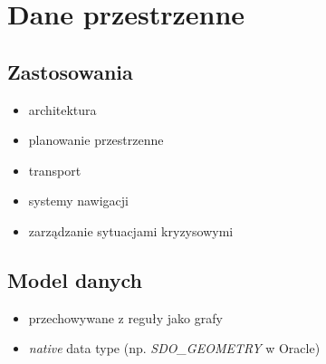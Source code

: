 \documentclass[12pt]{article}
\begin{document}
\begin{comment}
 * koszt
  - w najgorszym przypadku
  b_r * b_s + b_r
  - w najlepszym przypadku
  b_r + b_s

 * jesli zlaczenie jest rownozlaczeniem i dotyczy atrybutu ktory jest kluczem relacji wewnetrznej to przetwarzanie w petli wewnetrznej moze sie zatrzymac 
 * relacja wewnetrzna moze byc skanowana na przemian w przod i wstecz (zgodnosc z algorytmem LRU)

INDEXED NESTED-LOOP JOIN
 * zamiast skanowania relacji wewnetrznej mozna uzyc indeksu
  - zlaczenie jest rownorozlaczeniem
  - istnieje odpowiedni indeks dla relacji wewnetrznej
    - jezeli indeks nie istnieje to mozna rozwazyc utworzenie indeksu

 * jesli dostepne sa indeksy dla obu relacji to jako zewn. nalezy wybrac relacje o mniejszej liczbie krotek

Inne zagadnienia
- co z wynikami posrednimi
- zeby zrealizowac zadanie trzeba wykonac kilka operacji
- wyjscie operacji jest wejsciem dla kolejnej

Podsumowanie
- Optymalizacja kosztowa jest kosztowna
- Alternatywa
 - optymalizacja regulowa
 - rozwiazania mieszane
  - optymalizacja regulowa + kosztowa (odciecie bezsensownych rozwiazan)
  (optymalizacja regulowa nei sprawdzala sie sama bo nie brala pod uwage dystrybucji danych)
\end{comment}

\section{Dane przestrzenne}

\subsection{Zastosowania}
\begin{itemize}
\item architektura
\item planowanie przestrzenne
\item transport
\item systemy nawigacji
\item zarządzanie sytuacjami kryzysowymi
\end{itemize}


\subsection{Model danych}
\begin{itemize}
\item przechowywane z reguły jako grafy
\item \emph{native} data type (np. \emph{SDO\_GEOMETRY} w Oracle)
\end{itemize}
\end{document}
